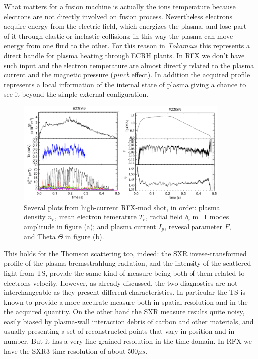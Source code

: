 What matters for a fusion machine is actually the ions temperature because electrons are not directly involved on fusion process.
Nevertheless electrons acquire energy from the electric field, which energizes the plasma, and lose part of it through elastic or inelastic collisions; in this way the plasma can move energy from one fluid to the other. For this reason in \textit{Tokamaks} this represents a direct handle for plasma heating through \acs{ECRH} plants. In RFX we don't have such input and the electron temperature are almost directly related to the plasma current and the magnetic pressure (\textit{pinch} effect).
In addition the acquired profile represents a local information of the internal state of plasma giving a chance to see it beyond the simple external configuration.
\begin{figure}
    \centering
    \includegraphics[height=5cm]{img/rfx/shot_example.png}
    \caption{ Several plots from high-current RFX-mod shot, in order: plasma density $n_e$, mean electron temerature $T_e$, radial field $b_r$ m=1 modes amplitude in figure (a); and plasma current $I_p$, revesal parameter $F$, and Theta $\Theta$ in figure (b). }
    \label{fig:rfx_shot_22069}
\end{figure}
This holds for the Thomson scattering too, indeed: the SXR invese-transformed profile of the plasma bremsstrahlung radiation, and the intensity of the scattered light from TS, provide the same kind of measure being both of them related to electrons velocity.
However, as already discussed, the two diagnostics are not interchangeable as they present different characteristics. In particular the TS is known to provide a more accurate measure both in spatial resolution and in the the acquired quantity. On the other hand the SXR measure results quite noisy, easily biased by plasma-wall interaction debris of carbon and other materials, and usually presenting a set of reconstructed points that vary in position and in number. But it has a very fine grained resolution in the time domain.
In RFX we have the SXR3 time resolution of about $500 \mu s$.
